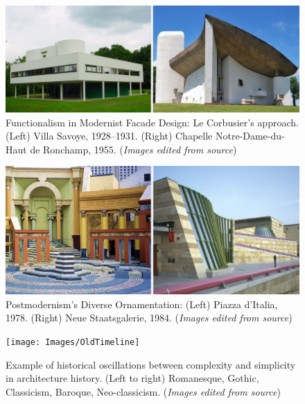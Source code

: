     \begin{figure}[htb]
        \centering
        \includegraphics[width= \linewidth]{Images/ModernistFacade}
        \caption{Functionalism in Modernist Facade Design: Le Corbusier's approach. (Left) Villa Savoye, 1928--1931. (Right) Chapelle Notre-Dame-du-Haut de Ronchamp, 1955. (\textit{Images edited from source})}
        \label{fig:Modernistfacade}
    \end{figure}

    \begin{figure}[htb]
        \centering
        \includegraphics[width= \linewidth]{Images/PostmodernOrnament}
        \caption{Postmodernism's Diverse Ornamentation: (Left) Piazza d’Italia, 1978. (Right) Neue Staatsgalerie, 1984. (\textit{Images edited from source})}
        \label{fig:postmodernOrnamnet}
    \end{figure}

    \begin{figure}[htb]
    \centering
    \texttt{[image: Images/OldTimeline]}
    \caption{Example of historical oscillations between complexity and simplicity in architecture history. (Left to right) Romanesque, Gothic, Classicism, Baroque, Neo-classicism. (\textit{Images edited from source})}
    \label{fig:Oldtimeline}
    \end{figure}

